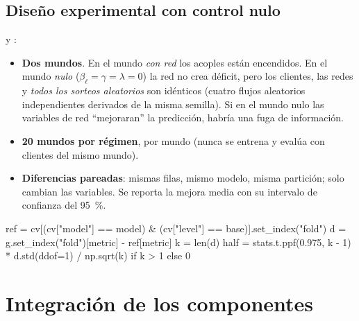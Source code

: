 \section{Diseño experimental con control nulo}
 y :
\begin{itemize}
\item \textbf{Dos mundos}. En el mundo \emph{con red} los acoples están encendidos. En
el mundo \emph{nulo} ($\beta_\ell=\gamma=\lambda=0$) la red no crea déficit, pero los
clientes, las redes y \emph{todos los sorteos aleatorios} son idénticos (cuatro flujos
aleatorios independientes derivados de la misma semilla). Si en el mundo nulo las
variables de red ``mejoraran'' la predicción, habría una fuga de información.
\item \textbf{20 mundos por régimen},  por mundo (nunca se entrena y
evalúa con clientes del mismo mundo).
\item \textbf{Diferencias pareadas}: mismas filas, mismo modelo, misma partición; solo
cambian las variables. Se reporta la mejora media con su intervalo de confianza del
95~\%.
\end{itemize}
\begin{codigo}[label=src/pulso/credit/evaluate.py · paired\_deltas]
ref = cv[(cv["model"] == model) & (cv["level"] == base)].set_index("fold")
d = g.set_index("fold")[metric] - ref[metric]
k = len(d)
half = stats.t.ppf(0.975, k - 1) * d.std(ddof=1) / np.sqrt(k) if k > 1 else 0
\end{codigo}

\chapter{Integración de los componentes}

